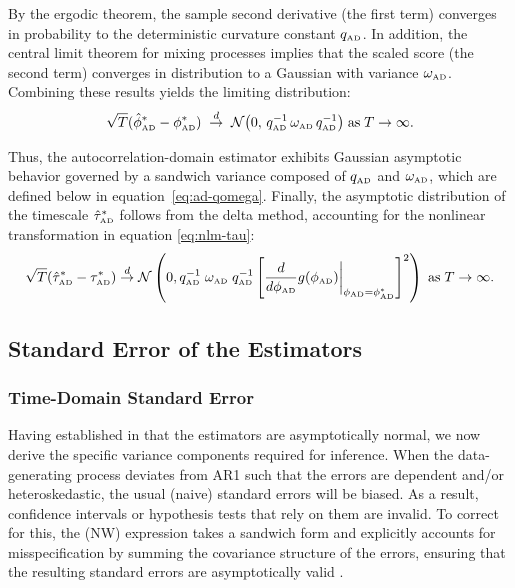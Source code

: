\documentclass[docs/main.tex]{subfiles}
\begin{document}
\noindent By the ergodic theorem, the sample second derivative (the first term) converges in probability to the deterministic curvature constant $q_{\scriptscriptstyle\text{AD}}$. In addition, the central limit theorem for mixing processes \citep[Theorem~14.33]{hansen_econometrics_2022} implies that the scaled score (the second term) converges in distribution to a Gaussian with variance $\omega_{\scriptscriptstyle\text{AD}}$. Combining these results yields the limiting distribution:
\begin{align}
    \sqrt{T}(\hat{\phi}^*_{\scriptscriptstyle\text{AD}} - \phi_{\scriptscriptstyle\text{AD}}^*) \;\overset{d}{\to}\; \mathcal{N}\big(0,\, q_{\scriptscriptstyle\text{AD}}^{-1}\,\omega_{\scriptscriptstyle\text{AD}}\,q_{\scriptscriptstyle\text{AD}}^{-1}\big)\;\text{as}\;T\to\infty.
\end{align}

\noindent Thus, the autocorrelation-domain estimator exhibits Gaussian asymptotic behavior governed by a sandwich variance composed of $q_{\scriptscriptstyle\text{AD}}$ and $\omega_{\scriptscriptstyle\text{AD}}$, which are defined below in equation~\eqref{eq:ad-qomega}. Finally, the asymptotic distribution of the timescale $\hat{\tau}^*_{\scriptscriptstyle\text{AD}}$ follows from the delta method, accounting for the nonlinear transformation in equation \eqref{eq:nlm-tau}:
\begin{align}
    \sqrt{T}(\hat{\tau}^*_{\scriptscriptstyle\text{AD}} - \tau_{\scriptscriptstyle\text{AD}}^*) \overset{d}{\to} \mathcal{N}\left(0, q_{\scriptscriptstyle\text{AD}}^{-1}\; \omega_{\scriptscriptstyle\text{AD}} \; q_{\scriptscriptstyle\text{AD}}^{-1} \left[\frac{d}{d\phi_{\scriptscriptstyle\text{AD}}} g(\phi_{\scriptscriptstyle\text{AD}})\bigg|_{\phi_{\scriptscriptstyle\text{AD}}=\phi_{\scriptscriptstyle\text{AD}}^*}\right]^2\right)\;\text{as}\;T\to\infty.
\end{align}

\subsection{Standard Error of the Estimators}\label{sec:stderr}
\subsubsection{Time-Domain Standard Error}\label{sec:stderr-time-domain}
Having established in  that the estimators are asymptotically normal, we now derive the specific variance components required for inference. When the data-generating process deviates from AR1 such that the errors are dependent and/or heteroskedastic, the usual (naive) standard errors will be biased. As a result, confidence intervals or hypothesis tests that rely on them are invalid. To correct for this, the \citet{newey_simple_1987} (NW) expression takes a sandwich form and explicitly accounts for misspecification by summing the covariance structure of the errors, ensuring that the resulting standard errors are asymptotically valid \citep[Theorem 14.32]{hansen_econometrics_2022}.\\
\end{document}
